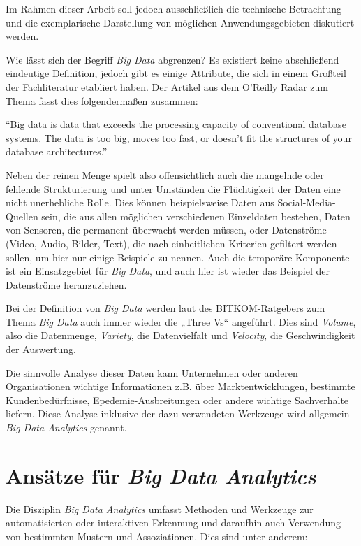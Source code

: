 Im Rahmen dieser Arbeit soll jedoch ausschließlich die technische Betrachtung und die exemplarische Darstellung von möglichen Anwendungsgebieten diskutiert werden.




Wie lässt sich der Begriff \textit{Big Data} abgrenzen? Es existiert keine abschließend eindeutige Definition, jedoch gibt es einige Attribute, die sich in einem Großteil der Fachliteratur etabliert haben. Der Artikel aus dem O'Reilly Radar zum Thema  fasst dies folgendermaßen zusammen: 

\enquote{Big data is data that exceeds the processing capacity of conventional database systems. The data is too big, moves too fast, or doesn’t fit the structures of your database architectures.}

Neben der reinen Menge spielt also offensichtlich auch die mangelnde oder fehlende Strukturierung und unter Umständen die Flüchtigkeit der Daten eine nicht unerhebliche Rolle. Dies können beispielsweise Daten aus Social-Media-Quellen sein, die aus allen möglichen verschiedenen Einzeldaten bestehen, Daten von Sensoren, die permanent überwacht werden müssen, oder Datenströme (Video, Audio, Bilder, Text), die nach einheitlichen Kriterien gefiltert werden sollen, um hier nur einige Beispiele zu nennen. Auch die temporäre Komponente ist ein Einsatzgebiet für \textit{Big Data}, und auch hier ist wieder das Beispiel der Datenströme heranzuziehen. 

Bei der Definition von \textit{Big Data} werden laut des BITKOM-Ratgebers zum Thema \textit{Big Data}  auch immer wieder die „Three Vs“ angeführt. Dies sind \textit{Volume}, also die Datenmenge, \textit{Variety}, die Datenvielfalt und \textit{Velocity}, die Geschwindigkeit der Auswertung. 

Die sinnvolle Analyse dieser Daten kann Unternehmen oder anderen Organisationen wichtige Informationen z.B. über Marktentwicklungen, bestimmte Kundenbedürfnisse, Epedemie-Ausbreitungen oder andere wichtige Sachverhalte liefern. Diese Analyse inklusive der dazu verwendeten Werkzeuge wird allgemein \textit{Big Data Analytics} genannt. 

\section{Ansätze für \textit{Big Data Analytics}}
\label{section:ansaetze für Big Data Analytics}


Die Disziplin \textit{Big Data Analytics} umfasst Methoden und Werkzeuge zur automatisierten oder interaktiven Erkennung und daraufhin auch Verwendung von bestimmten Mustern und Assoziationen. Dies sind unter anderem:

